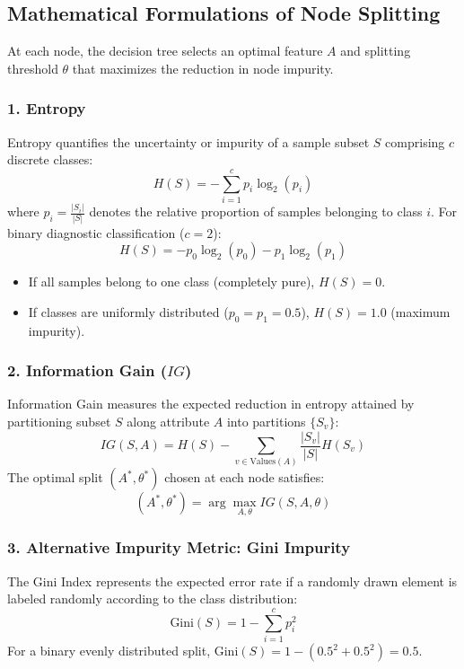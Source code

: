 \documentclass[12pt]{article}
\begin{document}
\subsection{Mathematical Formulations of Node Splitting}
At each node, the decision tree selects an optimal feature $A$ and splitting threshold $\theta$ that maximizes the reduction in node impurity.

\subsubsection{1. Entropy}
Entropy quantifies the uncertainty or impurity of a sample subset $S$ comprising $c$ discrete classes:
\begin{equation}
    H(S) = - \sum_{i=1}^{c} p_i \log_2(p_i)
\end{equation}
where $p_i = \frac{|S_i|}{|S|}$ denotes the relative proportion of samples belonging to class $i$. For binary diagnostic classification ($c=2$):
\begin{equation}
    H(S) = - p_0 \log_2(p_0) - p_1 \log_2(p_1)
\end{equation}
\begin{itemize}
    \item If all samples belong to one class (completely pure), $H(S) = 0$.
    \item If classes are uniformly distributed ($p_0 = p_1 = 0.5$), $H(S) = 1.0$ (maximum impurity).
\end{itemize}

\subsubsection{2. Information Gain ($IG$)}
Information Gain measures the expected reduction in entropy attained by partitioning subset $S$ along attribute $A$ into partitions $\{S_v\}$:
\begin{equation}
    IG(S, A) = H(S) - \sum_{v \in \text{Values}(A)} \frac{|S_v|}{|S|} H(S_v)
\end{equation}
The optimal split $(A^*, \theta^*)$ chosen at each node satisfies:
\begin{equation}
    (A^*, \theta^*) = \arg\max_{A, \theta} IG(S, A, \theta)
\end{equation}

\subsubsection{3. Alternative Impurity Metric: Gini Impurity}
The Gini Index represents the expected error rate if a randomly drawn element is labeled randomly according to the class distribution:
\begin{equation}
    \text{Gini}(S) = 1 - \sum_{i=1}^{c} p_i^2
\end{equation}
For a binary evenly distributed split, $\text{Gini}(S) = 1 - (0.5^2 + 0.5^2) = 0.5$.
\end{document}
